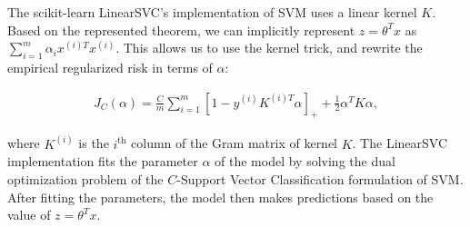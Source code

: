 The scikit-learn LinearSVC's implementation of SVM uses a linear kernel $K$. Based on the represented theorem, we can implicitly represent $z=\theta^Tx$ as $\sum_{i=1}^m\alpha_ix^{(i)T}x^{(i)}$. This allows us to use the kernel trick, and rewrite the empirical regularized risk in terms of $\alpha$:

\begin{align}\label{eq:SVM}
J_C(\alpha) = \frac{C}{m}\sum_{i=1}^m[1-y^{(i)}K^{(i)T}\alpha]_+ + \frac{1}{2}\alpha^TK\alpha,
\end{align}

where $K^{(i)}$ is the $i^{\mathrm{th}}$ column of the Gram matrix of kernel $K$. The LinearSVC implementation fits the parameter $\alpha$ of the model by solving the dual optimization problem of the $C$-Support Vector Classification formulation of SVM\cite{chang2011libsvm}. After fitting the parameters, the model then makes predictions based on the value of $z=\theta^Tx$.